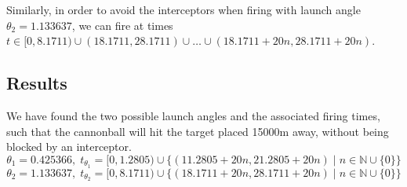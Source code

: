 \noindent
Similarly, in order to avoid the interceptors when firing with launch angle $\theta_2 = 1.133637$, we can fire at times $t \in [0, 8.1711) \cup (18.1711, 28.1711) \cup \dots \cup (18.1711 + 20n, 28.1711 + 20n)$.

\subsection{Results}
\noindent
We have found the two possible launch angles and the associated firing times, such that the cannonball will hit the target placed 15000m away, without being blocked by an interceptor.
$$\theta_1 = 0.425366, \; t_{\theta_1} = [0, 1.2805) \cup \{(11.2805 + 20n, 21.2805 + 20n) \; \vert \; n \in \mathbb{N} \cup \{0\}\}$$
$$\theta_2 = 1.133637, \; t_{\theta_2} = [0, 8.1711) \cup \{(18.1711 + 20n, 28.1711 + 20n) \; \vert \; n \in \mathbb{N} \cup \{0\}\}$$


